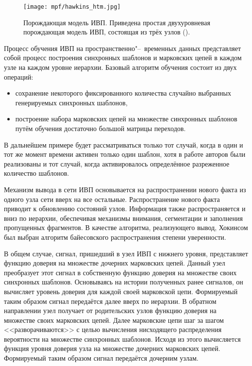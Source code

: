 \begin{figure}[h]
	\centering
	\texttt{[image: mpf/hawkins\_htm.jpg]}
	\caption{Порождающая модель ИВП. Приведена простая двухуровневая порождающая модель ИВП, состоящая из трёх узлов (\cite{Hawkins2009}).}
	\label{fg:hawkins_htm}
\end{figure}

Процесс обучения ИВП на пространственно"--~временных данных представляет собой процесс построения синхронных шаблонов и марковских цепей в каждом узле на каждом уровне иерархии. Базовый алгоритм обучения состоит из двух операций:
\begin{itemize}
	\item сохранение некоторого фиксированного количества случайно выбранных генерируемых синхронных шаблонов,
	\item построение набора марковских цепей на множестве синхронных шаблонов путём обучения достаточно большой матрицы переходов.
\end{itemize}
В дальнейшем примере будет рассматриваться только тот случай, когда в один и тот же момент времени активен только один шаблон, хотя в работе авторов были реализованы и тот случай, когда активировалось определённое разреженное количество шаблонов.

Механизм вывода в сети ИВП основывается на распространении нового факта из одного узла сети вверх на все остальные. Распространение нового факта приводит к обновлению состояний узлов. Информация также распространяется и вниз по иерархии, обеспечивая механизмы внимания, сегментации и заполнения пропущенных фрагментов. В качестве алгоритма, реализующего вывод, Хокинсом был выбран алгоритм байесовского распространения степени уверенности.

В общем случае, сигнал, пришедший в узел ИВП с нижнего уровня, представляет функцию доверия на множестве дочерних марковских цепей. Данный узел преобразует этот сигнал в собственную функцию доверия на множестве своих синхронных шаблонов. Основываясь на истории полученных ранее сигналов, он вычисляет уровень доверия для каждой своей марковской цепи. Формируемый таким образом сигнал передаётся далее вверх по иерархии. В обратном направлении узел получает от родительских узлов функцию доверия на множестве своих марковских цепей. Далее марковские цепи шаг за шагом <<разворачиваются>> с целью вычисления нисходящего распределения вероятности на множестве синхронных шаблонов. Исходя из этого вычисляется функция уровня доверия узла на множестве дочерних марковских цепей. Формируемый таким образом сигнал передаётся дочерним узлам.

